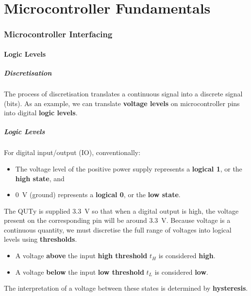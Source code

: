 \documentclass{article}
\begin{document}
\part{Microcontroller Fundamentals}
\section{Microcontroller Interfacing}
\subsection{Logic Levels}
\subsubsection{Discretisation}
The process of discretisation translates a continuous signal into a
discrete signal (bits). As an example, we can translate \textbf{voltage
levels} on microcontroller pins into digital \textbf{logic levels}.
\subsubsection{Logic Levels}
For digital input/output (IO), conventionally:
\begin{itemize}
    \item The voltage level of the positive power supply represents a
          \textbf{logical 1}, or the \textbf{high state}, and
    \item \qty{0}{V} (ground) represents a \textbf{logical 0}, or the \textbf{low state}.
\end{itemize}
The QUTy is supplied \qty{3.3}{V} so that when a digital output is high,
the voltage present on the corresponding pin will be around \qty{3.3}{V}.
Because voltage is a continuous quantity, we must discretise the full range of voltages into logical levels using \textbf{thresholds}.
\begin{itemize}
    \item A voltage \textbf{above} the input \textbf{high threshold}
          \(t_H\) is considered \textbf{high}.
    \item A voltage \textbf{below} the input \textbf{low threshold}
          \(t_L\) is considered \textbf{low}.
\end{itemize}
The interpretation of a voltage between these states is determined by \textbf{hysteresis}.
\end{document}
